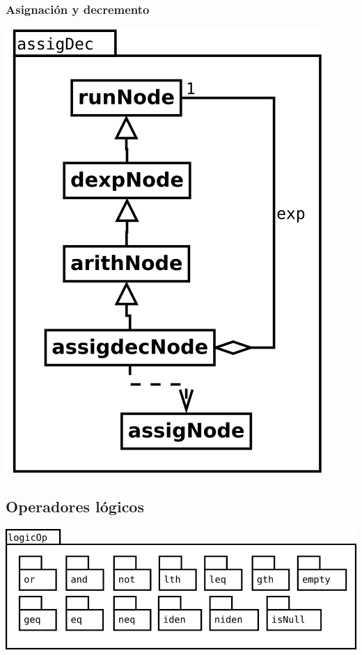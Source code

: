 \subsubsection {Asignación y decremento}
\begin{center}
\includegraphics[scale=0.4]{assigDec.png} \\
\end{center}
\pagebreak
\subsection {Operadores lógicos}
\begin{center}
\includegraphics[scale=0.4]{logicOp-package.png} \\
\end{center}

